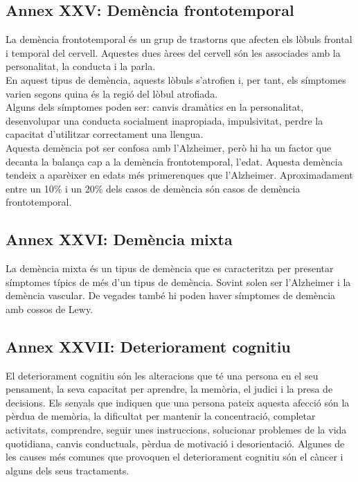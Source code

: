 \documentclass[a4paper,12pt]{article}
\begin{document}
\subsection*{Annex XXV: Demència frontotemporal}
La demència frontotemporal és un grup de trastorns que afecten els lòbuls frontal i temporal del cervell. Aquestes dues àrees del cervell són les associades amb la personalitat, la conducta i la parla.\\
En aquest tipus de demència, aquests lòbuls s'atrofien i, per tant, els símptomes varien segons quina és la regió del lòbul atrofiada.\\
Alguns dels símptomes poden ser: canvis dramàtics en la personalitat, desenvolupar una conducta socialment inapropiada, impulsivitat, perdre la capacitat d'utilitzar correctament una llengua.\\
Aquesta demència pot ser confosa amb l'Alzheimer, però hi ha un factor que decanta la balança cap a la demència frontotemporal, l'edat. Aquesta demència tendeix a aparèixer en edats més primerenques que l'Alzheimer. Aproximadament entre un 10\% i un 20\% dels casos de demència són casos de demència frontotemporal.
\subsection*{Annex XXVI: Demència mixta}
La demència mixta és un tipus de demència que es caracteritza per presentar símptomes típics de més d'un tipus de demència. Sovint solen ser l'Alzheimer i la demència vascular. De vegades també hi poden haver símptomes de demència amb cossos de Lewy.
\subsection*{Annex XXVII: Deteriorament cognitiu}
El deteriorament cognitiu són les alteracions que té una persona en el seu pensament, la seva capacitat per aprendre, la memòria, el judici i la presa de decisions. Els senyals que indiquen que una persona pateix aquesta afecció són la pèrdua de memòria, la dificultat per mantenir la concentració, completar activitats, comprendre, seguir unes instruccions, solucionar problemes de la vida quotidiana, canvis conductuals, pèrdua de motivació i desorientació. Algunes de les causes més comunes que provoquen el deteriorament cognitiu són el càncer i alguns dels seus tractaments.
\end{document}
